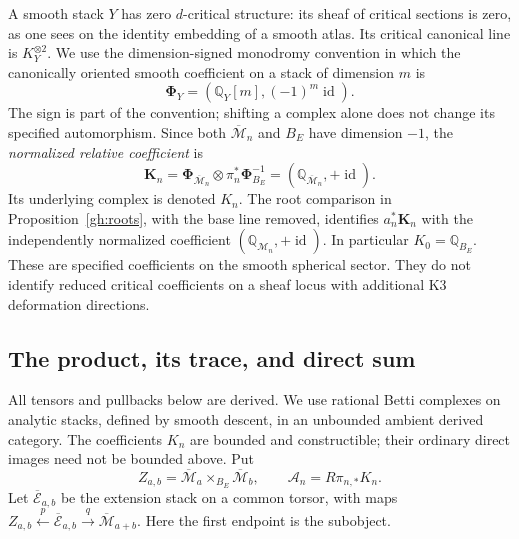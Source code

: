 A smooth stack $Y$ has zero $d$-critical structure: its sheaf of
critical sections is zero, as one sees on the identity embedding of a
smooth atlas. Its critical canonical line is $K_Y^{\otimes2}$.
We use the dimension-signed monodromy convention in which the
canonically oriented smooth coefficient on a stack of dimension $m$ is
\[
 \boldsymbol\Phi_Y=(\mathbb Q_Y[m],(-1)^m\operatorname{id}).
\]
The sign is part of the convention; shifting a complex alone does not
change its specified automorphism. Since both
$\overline{\mathcal M}_n$ and $B_E$ have dimension $-1$, the
\emph{normalized relative coefficient} is
\begin{equation}\label{gh:relative-coefficient}
 \boldsymbol K_n=
 \boldsymbol\Phi_{\overline{\mathcal M}_n}
       \otimes\pi_n^*\boldsymbol\Phi_{B_E}^{-1}
 =(\mathbb Q_{\overline{\mathcal M}_n},+\operatorname{id}).
\end{equation}
Its underlying complex is denoted $K_n$.
The root comparison in Proposition~\ref{gh:roots}, with the base line
removed, identifies $a_n^*\boldsymbol K_n$ with the independently
normalized coefficient
$(\mathbb Q_{\mathcal M_n},+\operatorname{id})$.
In particular $K_0=\mathbb Q_{B_E}$.
These are specified coefficients on the smooth spherical sector.
They do not identify reduced critical coefficients on a sheaf locus
with additional K3 deformation directions.

\subsection{The product, its trace, and direct sum}

All tensors and pullbacks below are derived. We use rational Betti
complexes on analytic stacks, defined by smooth descent, in an
unbounded ambient derived category. The coefficients $K_n$ are
bounded and constructible; their ordinary direct images need not be
bounded above. Put
\[
 Z_{a,b}=\overline{\mathcal M}_a\times_{B_E}
                          \overline{\mathcal M}_b,\qquad
 \mathcal A_n=R\pi_{n,*}K_n.
\]
Let $\overline{\mathcal E}_{a,b}$ be the extension stack on a common
torsor, with maps
$Z_{a,b}\xleftarrow{p}\overline{\mathcal E}_{a,b}
\xrightarrow{q}\overline{\mathcal M}_{a+b}$.
Here the first endpoint is the subobject.

